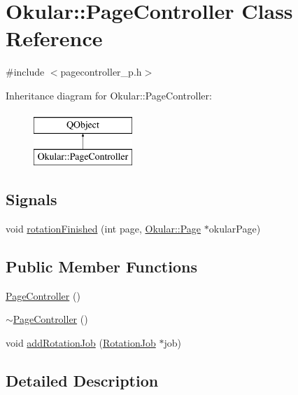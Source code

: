 \hypertarget{classOkular_1_1PageController}{\section{Okular\+:\+:Page\+Controller Class Reference}
\label{classOkular_1_1PageController}
}


{\ttfamily \#include $<$pagecontroller\+\_\+p.\+h$>$}

Inheritance diagram for Okular\+:\+:Page\+Controller\+:\begin{figure}[H]
\begin{center}
\leavevmode
\includegraphics[height=2.000000cm]{classOkular_1_1PageController}
\end{center}
\end{figure}
\subsection*{Signals}
\begin{DoxyCompactItemize}
\item 
void \hyperlink{classOkular_1_1PageController_aa8e38e82e5a1474347755d55407b3f0e}{rotation\+Finished} (int page, \hyperlink{classOkular_1_1Page}{Okular\+::\+Page} $\ast$okular\+Page)
\end{DoxyCompactItemize}
\subsection*{Public Member Functions}
\begin{DoxyCompactItemize}
\item 
\hyperlink{classOkular_1_1PageController_a4844fc29d1f93b4f247c51b1885cba05}{Page\+Controller} ()
\item 
\hyperlink{classOkular_1_1PageController_a5b59dff0862c0906a3556807c18c69ed}{$\sim$\+Page\+Controller} ()
\item 
void \hyperlink{classOkular_1_1PageController_a85c06a553751b2a8639167a871ac7abf}{add\+Rotation\+Job} (\hyperlink{classOkular_1_1RotationJob}{Rotation\+Job} $\ast$job)
\end{DoxyCompactItemize}


\subsection{Detailed Description}


